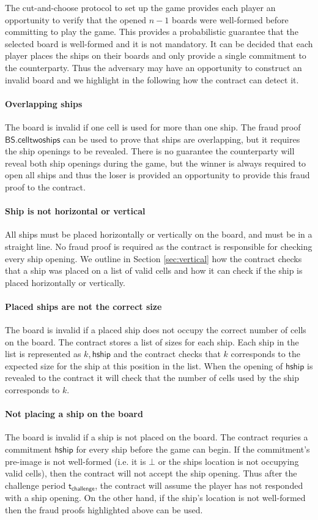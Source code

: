 \documentclass{llncs}
\newcommand{\hship}{\mathsf{hship}}
\newcommand{\battleshiptwoships}{\mathsf{BS.celltwoships}}
\newcommand{\timechallenge}{\mathsf{t}_{\mathsf{challenge}}}
\begin{document}
The cut-and-choose protocol to set up the game provides each player an opportunity to verify that the opened $n-1$ boards were well-formed before committing to play the game. 
This provides a probabilistic guarantee that the selected board is well-formed and it is not mandatory. 
It can be decided that each player places the ships on their boards and only provide a single commitment to the counterparty. 
Thus the adversary may have an opportunity to construct an invalid board and we highlight in the following how the contract can detect it. 

\paragraph{Overlapping ships}
The board is invalid if one cell is used for more than one ship. 
The fraud proof $\battleshiptwoships$ can be used to prove that ships are overlapping, but it requires the ship openings to be revealed. 
There is no guarantee the counterparty will reveal both ship openings during the game, but the winner is always required to open all ships and thus the loser is provided an opportunity to provide this fraud proof to the contract. 

\paragraph{Ship is not horizontal or vertical}
All ships must be placed horizontally or vertically on the board, and must be in a straight line. 
No fraud proof is required as the contract is responsible for checking every ship opening. 
We outline in Section \ref{sec:vertical} how the contract checks that a ship was placed on a list of valid cells and how it can check if the ship is placed horizontally or vertically. 

\paragraph{Placed ships are not the correct size} 
The board is invalid if a placed ship does not occupy the correct number of cells on the board. 
The contract stores a list of sizes for each ship. 
Each ship in the list is represented as $k,\hship$ and the contract checks that $k$ corresponds to the expected size for the ship at this position in the list. 
When the opening of $\hship$ is revealed to the contract it will check that the number of cells used by the ship corresponds to $k$. 

\paragraph{Not placing a ship on the board} 
The board is invalid if a ship is not placed on the board. 
The contract requries a commitment $\hship$ for every ship before the game can begin.
If the commitment's pre-image is not well-formed (i.e. it is $\bot$ or the ships location is not occupying valid cells), then the contract will not accept the ship opening.
Thus after the challenge period $\timechallenge$, the contract will assume the player has not responded with a ship opening.
On the other hand, if the ship's location is not well-formed then the fraud proofs highlighted above can be used. 
\end{document}

